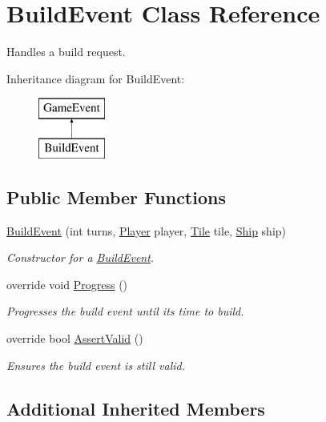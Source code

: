 \hypertarget{class_build_event}{}\section{Build\+Event Class Reference}
\label{class_build_event}


Handles a build request.  


Inheritance diagram for Build\+Event\+:\begin{figure}[H]
\begin{center}
\leavevmode
\includegraphics[height=2.000000cm]{class_build_event}
\end{center}
\end{figure}
\subsection*{Public Member Functions}
\begin{DoxyCompactItemize}
\item 
\hyperlink{class_build_event_a44d63e592cb6a90e2b23f2d741f4f6ed}{Build\+Event} (int turns, \hyperlink{class_player}{Player} player, \hyperlink{class_tile}{Tile} tile, \hyperlink{class_ship}{Ship} ship)
\begin{DoxyCompactList}\small\item\em Constructor for a \hyperlink{class_build_event}{Build\+Event}. \end{DoxyCompactList}\item 
override void \hyperlink{class_build_event_a69284737235550d9706292c5212ba228}{Progress} ()
\begin{DoxyCompactList}\small\item\em Progresses the build event until it\textquotesingle{}s time to build. \end{DoxyCompactList}\item 
override bool \hyperlink{class_build_event_a6b294461f83c3e855658190b0e4d96c8}{Assert\+Valid} ()
\begin{DoxyCompactList}\small\item\em Ensures the build event is still valid. \end{DoxyCompactList}\end{DoxyCompactItemize}
\subsection*{Additional Inherited Members}


